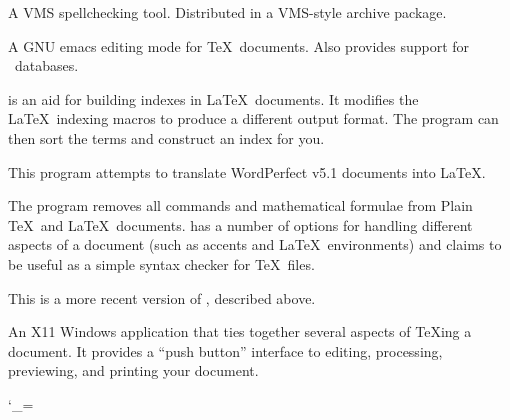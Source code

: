 
A VMS spellchecking tool.  Distributed in a VMS-style archive package.


A GNU emacs editing mode for \TeX\ documents.  Also provides support for
\BibTeX\ databases.


 is an aid for building indexes in \LaTeX\ documents.
It modifies the \LaTeX\ indexing macros to produce a different output
format.  The  program can then sort the terms and
construct an index for you.


This program attempts to translate WordPerfect v5.1 documents into
\LaTeX.


The  program removes all commands and mathematical formulae
from Plain \TeX\ and \LaTeX\ documents.   has a number of options
for handling different aspects of a document (such as accents and
\LaTeX\ environments) and claims to be useful as a simple syntax checker
for \TeX\ files.


This is a more recent version of , described above.


An X11 Windows application that ties together several
aspects of \TeX{}ing a document.  It provides a ``push button'' interface
to editing, processing, previewing, and printing your document.

\catcode`\_=\ubarcatcode \let\ubarcatcode\relax

